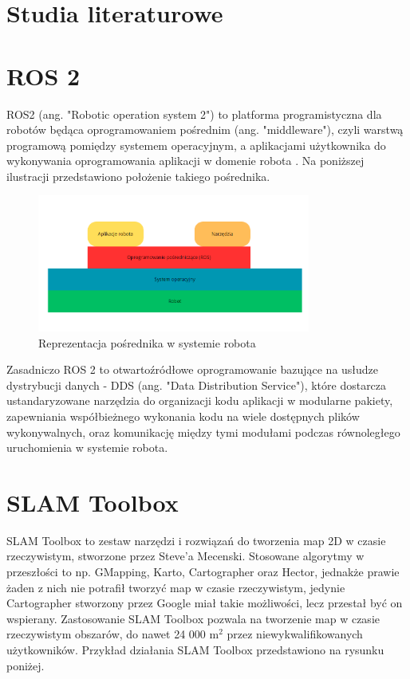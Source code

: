 \documentclass[a4paper,twoside,12pt]{book}
\begin{document}
\section{Studia literaturowe}
\section{ROS 2}
ROS2 (ang. "Robotic operation system 2") to platforma programistyczna dla robotów będąca oprogramowaniem pośrednim (ang. "middleware"), czyli warstwą programową pomiędzy systemem operacyjnym, a aplikacjami użytkownika do wykonywania oprogramowania aplikacji w domenie robota \cite{bib:ros2Concise}. Na poniższej ilustracji przedstawiono położenie takiego pośrednika.
\begin{figure}[h]
	\centering
	\includegraphics[width=0.8\textwidth]{images/middle.png}
	\caption{Reprezentacja pośrednika w systemie robota \cite{bib:ros2Concise}}
	\label{fig:middle}
	\end{figure}
\newline
Zasadniczo ROS 2 to otwartoźródłowe oprogramowanie bazujące na usłudze dystrybucji danych - DDS (ang. "Data Distribution Service"), które dostarcza ustandaryzowane narzędzia do organizacji kodu aplikacji w modularne pakiety, zapewniania współbieżnego wykonania kodu na wiele dostępnych plików wykonywalnych, oraz komunikację między tymi modułami podczas równoległego uruchomienia w systemie robota.\cite{bib:guide}

\newpage
\section{SLAM Toolbox}
SLAM Toolbox to zestaw narzędzi i rozwiązań do tworzenia map 2D w czasie rzeczywistym, stworzone przez Steve'a Mecenski.
 Stosowane algorytmy w przeszłości to np. GMapping, Karto, Cartographer oraz Hector, jednakże prawie żaden z nich nie potrafił tworzyć map w czasie rzeczywistym, jedynie Cartographer stworzony przez Google miał takie możliwości, lecz przestał być on wspierany.
 \cite{bib:slamtoolbox} Zastosowanie SLAM Toolbox pozwala na tworzenie map w czasie rzeczywistym obszarów, do nawet 24 000 m$^2$ przez niewykwalifikowanych użytkowników. Przykład działania SLAM Toolbox przedstawiono na rysunku poniżej.
\end{document}
